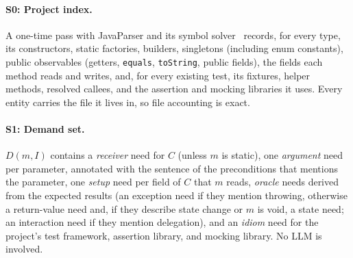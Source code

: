 \documentclass[sigconf,nonacm]{acmart}
\begin{document}
\paragraph{S0: Project index.}
A one-time pass with JavaParser and its symbol solver~\cite{javaparser} records, for every type, its constructors, static factories, builders, singletons (including enum constants), public observables (getters, \texttt{equals}, \texttt{toString}, public fields), the fields each method reads and writes, and, for every existing test, its fixtures, helper methods, resolved callees, and the assertion and mocking libraries it uses. Every entity carries the file it lives in, so file accounting is exact.

\paragraph{S1: Demand set.}
$D(m,I)$ contains a \emph{receiver} need for $C$ (unless $m$ is static), one \emph{argument} need per parameter, annotated with the sentence of the preconditions that mentions the parameter, one \emph{setup} need per field of $C$ that $m$ reads, \emph{oracle} needs derived from the expected results (an exception need if they mention throwing, otherwise a return-value need and, if they describe state change or $m$ is void, a state need; an interaction need if they mention delegation), and an \emph{idiom} need for the project's test framework, assertion library, and mocking library. No LLM is involved.
\end{document}

